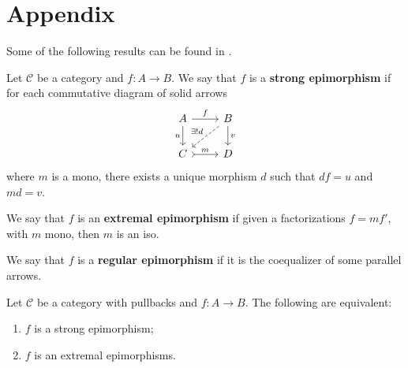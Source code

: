 \appendix
\chapter*{Appendix}
{}
\setcounter{chapter}{1}
\setcounter{theo}{0}

\fontsize{12}{14.5}\selectfont


Some of the following results can be found in \cite{BorceuxBourn2004}.

\begin{mainbox}{}
    \begin{defi}
        Let $\mathcal{C}$ be a category and $f : A \to B$. We say that $f$ is a \textbf{strong epimorphism} if for each commutative diagram of solid arrows
    \[
\begin{tikzcd}
    A \arrow[r, "f"] \arrow[d, "u"'] & B \arrow[d, "v"] \arrow[ld, "\exists ! d"', dashed] \\
    C \arrow[r, "m", tail]           & D                                                  
    \end{tikzcd}
    \]
    where $m$ is a mono, there exists a unique morphism $d$ such that $df=u$ and $md=v$.

    We say that $f$ is an \textbf{extremal epimorphism} if given a factorizations $f=mf'$, with $m$ mono, then $m$ is an iso.

    We say that $f$ is a \textbf{regular epimorphism} if it is the coequalizer of some parallel arrows.
    \end{defi}
\end{mainbox}

\begin{mainbox}{}
    \begin{prop}\label{Eqivalence strong epi with iso}
    Let $\mathcal{C}$ be a category with pullbacks and $f : A \to B$. The following are equivalent:
    \begin{enumerate}
        \item $f$ is a strong epimorphism;
        \item $f$ is an extremal epimorphisms.
    \end{enumerate}
    \end{prop}
\end{mainbox}

